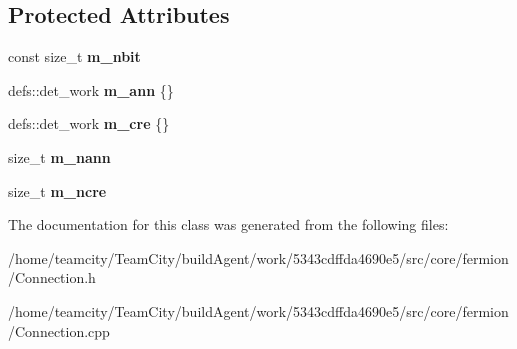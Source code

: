 \subsection*{Protected Attributes}
\begin{DoxyCompactItemize}
\item 
const size\+\_\+t {\bfseries m\+\_\+nbit}\hypertarget{classConnection_a8aadc0ee3e3e3fe998c5f4815f04e2e8}{}\label{classConnection_a8aadc0ee3e3e3fe998c5f4815f04e2e8}

\item 
defs\+::det\+\_\+work {\bfseries m\+\_\+ann} \{\}\hypertarget{classConnection_aab1226dd30dcdd41602974626a2a1e71}{}\label{classConnection_aab1226dd30dcdd41602974626a2a1e71}

\item 
defs\+::det\+\_\+work {\bfseries m\+\_\+cre} \{\}\hypertarget{classConnection_a6885ccdb80c52b6042974655b2188340}{}\label{classConnection_a6885ccdb80c52b6042974655b2188340}

\item 
size\+\_\+t {\bfseries m\+\_\+nann}\hypertarget{classConnection_a3335fdc82d07554572094f3003aa3076}{}\label{classConnection_a3335fdc82d07554572094f3003aa3076}

\item 
size\+\_\+t {\bfseries m\+\_\+ncre}\hypertarget{classConnection_a705e6a0307c83e213a0587804a5c2c91}{}\label{classConnection_a705e6a0307c83e213a0587804a5c2c91}

\end{DoxyCompactItemize}


The documentation for this class was generated from the following files\+:\begin{DoxyCompactItemize}
\item 
/home/teamcity/\+Team\+City/build\+Agent/work/5343cdffda4690e5/src/core/fermion/Connection.\+h\item 
/home/teamcity/\+Team\+City/build\+Agent/work/5343cdffda4690e5/src/core/fermion/Connection.\+cpp\end{DoxyCompactItemize}

